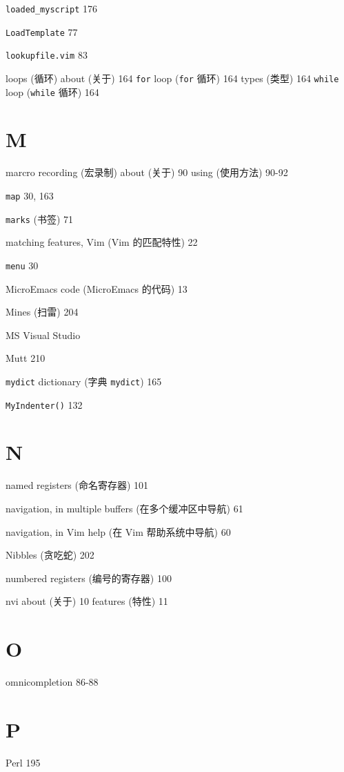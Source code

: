 \texttt{loaded\_myscript} 176

\texttt{LoadTemplate} 77

\texttt{lookupfile.vim} 83

loops (循环)
  about (关于) 164
  \texttt{for} loop (\texttt{for} 循环) 164
  types (类型) 164
  \texttt{while} loop (\texttt{while} 循环) 164

\section{M}

marcro recording (宏录制)
  about (关于) 90
  using (使用方法) 90-92

\texttt{map} 30, 163

\texttt{marks} (书签) 71

matching features, Vim (Vim 的匹配特性) 22

\texttt{menu} 30

MicroEmacs code (MicroEmacs 的代码) 13

Mines (扫雷) 204

MS Visual Studio

Mutt 210

\texttt{mydict} dictionary (字典 \texttt{mydict}) 165

\texttt{MyIndenter()} 132

\section{N}

named registers (命名寄存器) 101

navigation, in multiple buffers (在多个缓冲区中导航) 61

navigation, in Vim help (在 Vim 帮助系统中导航) 60

Nibbles (贪吃蛇) 202

numbered registers (编号的寄存器) 100

nvi
  about (关于) 10
  features (特性) 11

\section{O}

omnicompletion 86-88

\section{P}

Perl 195

